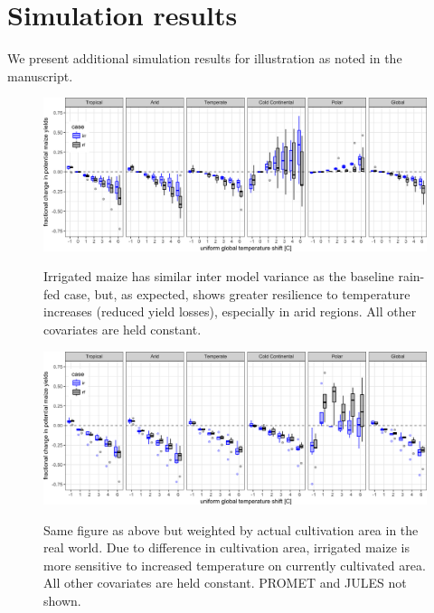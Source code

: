 \documentclass[10pt]{article}
\begin{document}
{\clearpage
\section{Simulation results}
We present additional simulation results for illustration as noted in the manuscript. 

\begin{figure}[h!]
\includegraphics[width=\textwidth]{s_sim_KG_irr_all.png}\\
\caption{Irrigated maize has similar inter model variance as the baseline rain-fed case, but, as expected, shows greater resilience to temperature increases (reduced yield losses), especially in arid regions. All other covariates are held constant.}
\label{fig:KGirr_all}
\end{figure}

\begin{figure}[h!]
\includegraphics[width=\textwidth]{s_maize_sim_CG_area_weight.png}\\
\caption{Same figure as above but weighted by actual cultivation area in the real world. Due to difference in cultivation area, irrigated maize is more sensitive to increased temperature on currently cultivated area. All other covariates are held constant. PROMET and JULES not shown.}
\label{fig:KGirr_currentcult}
\end{figure}


}
\end{document}

